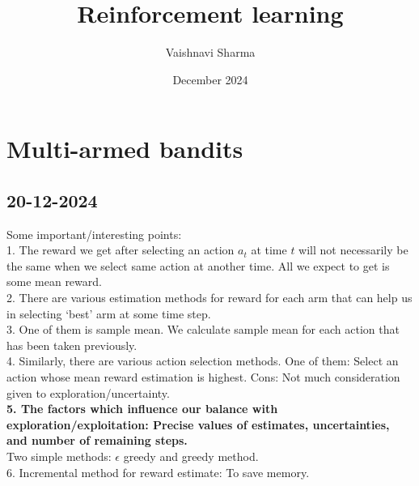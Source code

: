 \documentclass{article}
\title{Reinforcement learning}
\author{Vaishnavi Sharma}
\date{December 2024}
\begin{document}
\maketitle

\section{Multi-armed bandits}
\subsection{20-12-2024}
Some important/interesting points:\\
1. The reward we get after selecting an action $a_{t}$ at time $t$ will not necessarily be the same when we select same action at another time. All we expect to get is some mean reward. \\
2. There are various estimation methods for reward for each arm that can help us in selecting `best' arm at some time step.\\
3. One of them is sample mean. We calculate sample mean for each action that has been taken previously.\\
4. Similarly, there are various action selection methods. One of them: Select an action whose mean reward estimation is highest. Cons: Not much consideration given to exploration/uncertainty.\\
\textbf{5. The factors which influence our balance with exploration/exploitation: Precise values of estimates, uncertainties, and number of remaining steps.}\\

Two simple methods: $\epsilon$ greedy and greedy method.\\
6. Incremental method for reward estimate: To save memory.
\end{document}
